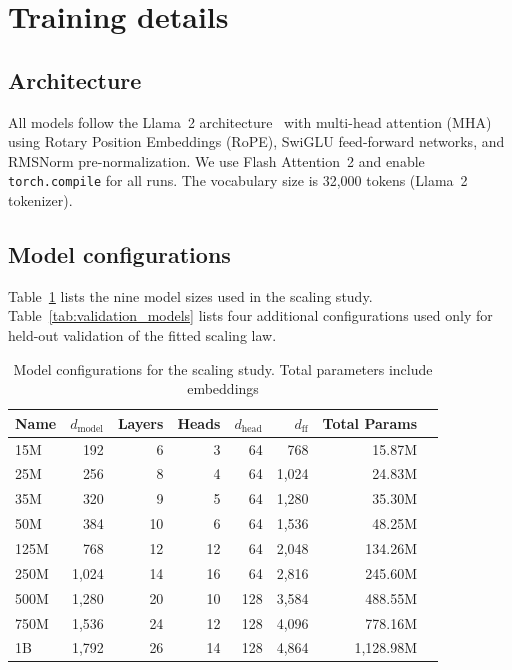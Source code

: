 \section{Training details}
\label{app:training_details}

\subsection{Architecture}

All models follow the Llama~2 architecture~\citep{touvron2023llama} with multi-head attention (MHA) using Rotary Position Embeddings (RoPE), SwiGLU feed-forward networks, and RMSNorm pre-normalization. We use Flash Attention~2 and enable \texttt{torch.compile} for all runs. The vocabulary size is 32,000 tokens (Llama~2 tokenizer).

\subsection{Model configurations}

Table~\ref{tab:model_configs} lists the nine model sizes used in the scaling study. Table~\ref{tab:validation_models} lists four additional configurations used only for held-out validation of the fitted scaling law.

\begin{table}[t]
\centering
\caption{Model configurations for the scaling study. Total parameters include embeddings}
\label{tab:model_configs}
\small
\begin{tabular}{lrrrrrrr}
\toprule
Name & $d_\text{model}$ & Layers & Heads & $d_\text{head}$ & $d_\text{ff}$ & Total Params \\
\midrule
15M  & 192   & 6  & 3  & 64  & 768   & 15.87M    \\
25M  & 256   & 8  & 4  & 64  & 1,024 & 24.83M    \\
35M  & 320   & 9  & 5  & 64  & 1,280 & 35.30M    \\
50M  & 384   & 10 & 6  & 64  & 1,536 & 48.25M    \\
125M & 768   & 12 & 12 & 64  & 2,048 & 134.26M   \\
250M & 1,024 & 14 & 16 & 64  & 2,816 & 245.60M   \\
500M & 1,280 & 20 & 10 & 128 & 3,584 & 488.55M   \\
750M & 1,536 & 24 & 12 & 128 & 4,096 & 778.16M   \\
1B   & 1,792 & 26 & 14 & 128 & 4,864 & 1,128.98M \\
\bottomrule
\end{tabular}
\end{table}

